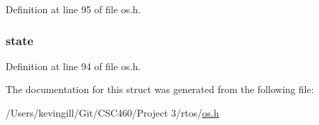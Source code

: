 Definition at line 95 of file os.\+h.

\subsubsection[{\texorpdfstring{state}{state}}]{ state}\hypertarget{struct_event_ae3be0d78000920b3d5ebc4be1480d438}{}\label{struct_event_ae3be0d78000920b3d5ebc4be1480d438}


Definition at line 94 of file os.\+h.



The documentation for this struct was generated from the following file\+:\begin{DoxyCompactItemize}
\item 
/\+Users/kevingill/\+Git/\+C\+S\+C460/\+Project 3/rtos/\hyperlink{os_8h}{os.\+h}\end{DoxyCompactItemize}

